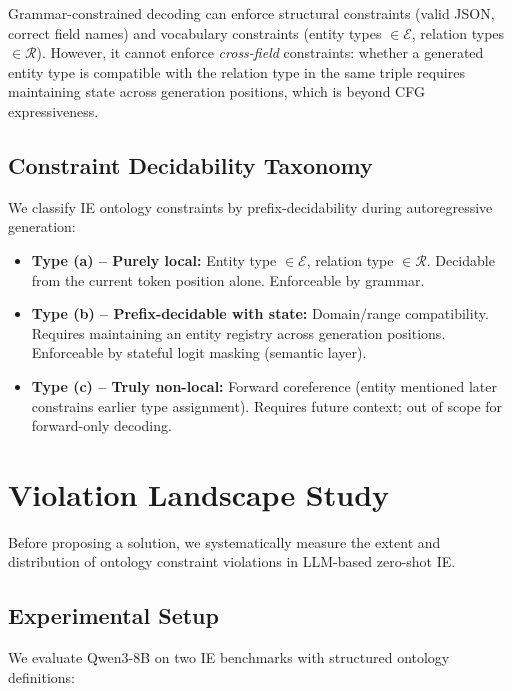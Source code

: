 \documentclass[11pt,a4paper]{article}
\begin{document}
Grammar-constrained decoding can enforce structural constraints (valid JSON, correct field names) and vocabulary constraints (entity types $\in \mathcal{E}$, relation types $\in \mathcal{R}$).
However, it cannot enforce \emph{cross-field} constraints: whether a generated entity type is compatible with the relation type in the same triple requires maintaining state across generation positions, which is beyond CFG expressiveness.

\subsection{Constraint Decidability Taxonomy}

We classify IE ontology constraints by prefix-decidability during autoregressive generation:
\begin{itemize}
    \item \textbf{Type (a) -- Purely local:} Entity type $\in \mathcal{E}$, relation type $\in \mathcal{R}$. Decidable from the current token position alone. Enforceable by grammar.
    \item \textbf{Type (b) -- Prefix-decidable with state:} Domain/range compatibility. Requires maintaining an entity registry across generation positions. Enforceable by stateful logit masking (semantic layer).
    \item \textbf{Type (c) -- Truly non-local:} Forward coreference (entity mentioned later constrains earlier type assignment). Requires future context; out of scope for forward-only decoding.
\end{itemize}

\section{Violation Landscape Study}
\label{sec:landscape}

Before proposing a solution, we systematically measure the extent and distribution of ontology constraint violations in LLM-based zero-shot IE.

\subsection{Experimental Setup}

We evaluate Qwen3-8B on two IE benchmarks with structured ontology definitions:
\end{document}
